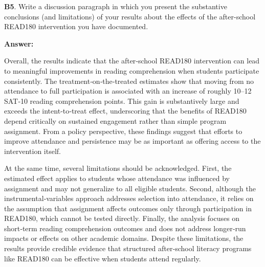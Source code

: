 \documentclass[
  letterpaper,
  DIV=11,
  numbers=noendperiod]{scrartcl}
\begin{document}
\textbf{B5}. Write a discussion paragraph in which you present the
substantive conclusions (and limitations) of your results about the
eﬀects of the after-school READ180 intervention you have documented.

\textbf{Answer:}

Overall, the results indicate that the after‑school READ180 intervention
can lead to meaningful improvements in reading comprehension when
students participate consistently. The treatment‑on‑the‑treated
estimates show that moving from no attendance to full participation is
associated with an increase of roughly 10--12 SAT‑10 reading
comprehension points. This gain is substantively large and exceeds the
intent‑to‑treat effect, underscoring that the benefits of READ180 depend
critically on sustained engagement rather than simple program
assignment. From a policy perspective, these findings suggest that
efforts to improve attendance and persistence may be as important as
offering access to the intervention itself.

At the same time, several limitations should be acknowledged. First, the
estimated effect applies to students whose attendance was influenced by
assignment and may not generalize to all eligible students. Second,
although the instrumental‑variables approach addresses selection into
attendance, it relies on the assumption that assignment affects outcomes
only through participation in READ180, which cannot be tested directly.
Finally, the analysis focuses on short‑term reading comprehension
outcomes and does not address longer‑run impacts or effects on other
academic domains. Despite these limitations, the results provide
credible evidence that structured after‑school literacy programs like
READ180 can be effective when students attend regularly.
\end{document}
